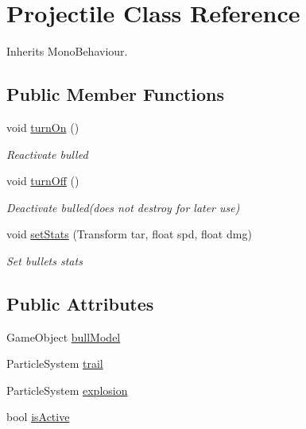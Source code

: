 \hypertarget{class_projectile}{}\section{Projectile Class Reference}
\label{class_projectile}


Inherits Mono\+Behaviour.

\subsection*{Public Member Functions}
\begin{DoxyCompactItemize}
\item 
void \hyperlink{class_projectile_a6bf684ed318fad3b7879badd9bc2f5ce}{turn\+On} ()
\begin{DoxyCompactList}\small\item\em Reactivate bulled \end{DoxyCompactList}\item 
void \hyperlink{class_projectile_a7a08b520044e867eca5a4d40fd6679af}{turn\+Off} ()
\begin{DoxyCompactList}\small\item\em Deactivate bulled(does not destroy for later use) \end{DoxyCompactList}\item 
void \hyperlink{class_projectile_a81e5a8a3f48e7c8bed742a96f32d3cb6}{set\+Stats} (Transform tar, float spd, float dmg)
\begin{DoxyCompactList}\small\item\em Set bullets stats \end{DoxyCompactList}\end{DoxyCompactItemize}
\subsection*{Public Attributes}
\begin{DoxyCompactItemize}
\item 
Game\+Object \hyperlink{class_projectile_a9a0edaa8c8eaee9b5e8e8979b43e8752}{bull\+Model}
\item 
Particle\+System \hyperlink{class_projectile_a0a258f946bd0b507f38d53040b06858b}{trail}
\item 
Particle\+System \hyperlink{class_projectile_a72e0cf3a5f104ca4508c71acc3a3b29d}{explosion}
\item 
bool \hyperlink{class_projectile_ac900a410e1793122901e6452f077bb4a}{is\+Active}
\end{DoxyCompactItemize}


